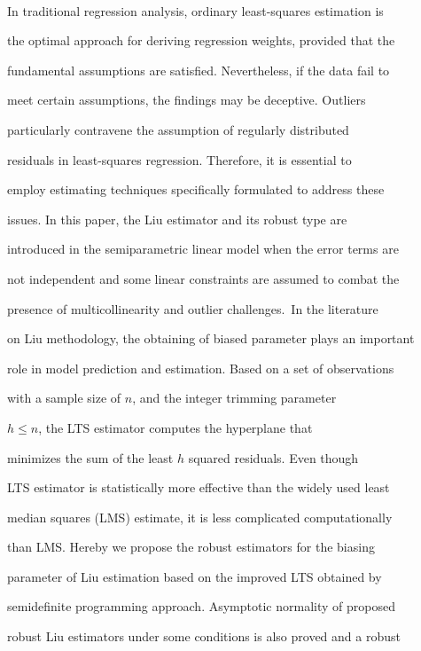 \documentclass[10pt,twoside]{article}
\numberwithin{equation}{section}
\begin{document}

\\

In traditional regression analysis, ordinary least-squares estimation is

the optimal approach for deriving regression weights, provided that the

fundamental assumptions are satisfied. Nevertheless, if the data fail to

meet certain assumptions, the findings may be deceptive. Outliers

particularly contravene the assumption of regularly distributed

residuals in least-squares regression. Therefore, it is essential to

employ estimating techniques specifically formulated to address these

issues. In this paper, the Liu estimator and its robust type are

introduced in the semiparametric linear model when the error terms are

not independent and some linear constraints are assumed to combat the

presence of multicollinearity and outlier challenges.~In the literature

on Liu methodology, the obtaining of biased parameter plays an important

role in model prediction and estimation. Based on a set of observations

with a sample size of $n$, and the integer trimming parameter

$h \leq n$, the LTS estimator computes the hyperplane that

minimizes the sum of the least $h$ squared residuals. Even though

LTS estimator is statistically more effective than the widely used least

median squares (LMS) estimate, it is less complicated computationally

than LMS. Hereby we propose the robust estimators for the biasing

parameter of Liu estimation based on the improved LTS obtained by

semidefinite programming approach. Asymptotic normality of proposed

robust Liu estimators under some conditions is also proved and a robust
\end{document}
